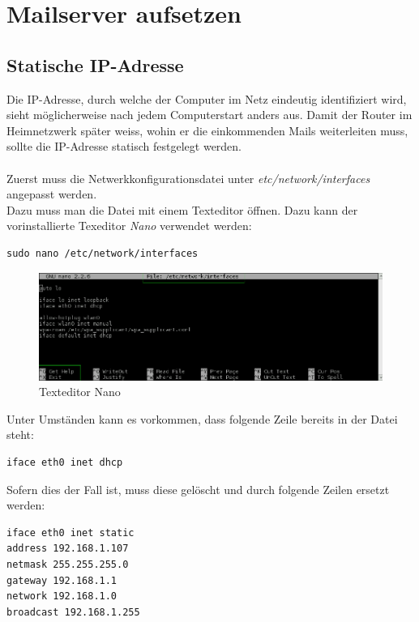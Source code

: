 \section{Mailserver aufsetzen}

\subsection{Statische IP-Adresse}
Die IP-Adresse, durch welche der Computer im Netz eindeutig identifiziert wird, sieht möglicherweise nach jedem Computerstart anders aus. Damit der Router im Heimnetzwerk später weiss, wohin er die einkommenden Mails weiterleiten muss, sollte die IP-Adresse statisch festgelegt werden.
\\
\\
Zuerst muss die Netwerkkonfigurationsdatei unter \textit{etc/network/interfaces} angepasst werden.
\\
Dazu muss man die Datei mit einem Texteditor öffnen. Dazu kann der vorinstallierte Texeditor \textit{Nano} verwendet werden:

\begin{lstlisting}
sudo nano /etc/network/interfaces
\end{lstlisting}

\begin{figure}[H]
\centering
\includegraphics[scale=0.6]{images/nano}
\caption{Texteditor Nano}
\end{figure}

Unter Umständen kann es vorkommen, dass folgende Zeile bereits in der Datei steht:

\begin{lstlisting}
iface eth0 inet dhcp
\end{lstlisting}

Sofern dies der Fall ist, muss diese gelöscht und durch folgende Zeilen ersetzt werden:

\begin{lstlisting}
iface eth0 inet static
address 192.168.1.107
netmask 255.255.255.0
gateway 192.168.1.1
network 192.168.1.0
broadcast 192.168.1.255
\end{lstlisting}

